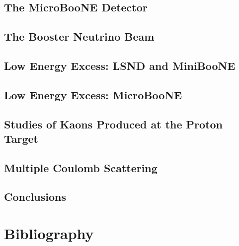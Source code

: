 \documentclass[11pt,openright,twoside,letterpaper,onecolumn]{report} %
\begin{document}
\chapter{The MicroBooNE Detector}
\label{sec:detector}


\chapter{The Booster Neutrino Beam}
\label{sec:beam}


\chapter{Low Energy Excess: LSND and MiniBooNE}
\label{sec:LEEhistory}


\chapter{Low Energy Excess: MicroBooNE}
\label{sec:LEEsensitivity}


\chapter{Studies of Kaons Produced at the Proton Target}
\label{sec:kaon}


\chapter{Multiple Coulomb Scattering}
\label{sec:MCS}


\chapter{Conclusions}
\label{sec:conclusions}



\part{Bibliography}
 

\end{document}

